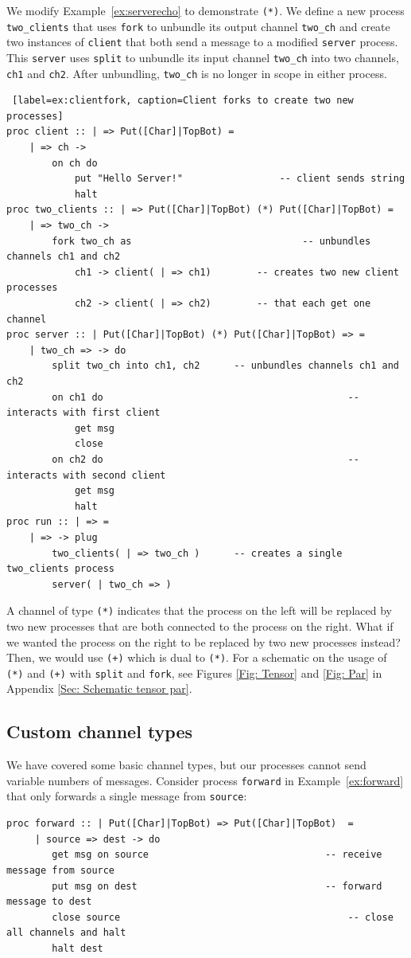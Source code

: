 \documentclass[11pt]{article}
\begin{document}
We modify Example~\ref{ex:serverecho} to demonstrate \lstinline$(*)$.
We define a new process \lstinline$two_clients$ that uses \lstinline$fork$ to unbundle its output channel \lstinline$two_ch$ and create two instances of \lstinline$client$ that both send a message to a modified \lstinline$server$ process. 
This \lstinline$server$ uses \lstinline$split$ to unbundle its input channel \lstinline$two_ch$ into two channels, \lstinline$ch1$ and \lstinline$ch2$. After unbundling, \lstinline$two_ch$ is no longer in scope in either process. %

\newpage
\begin{lstlisting} [label=ex:clientfork, caption=Client forks to create two new processes]
proc client :: | => Put([Char]|TopBot) =
	| => ch ->
		on ch do
			put "Hello Server!"					-- client sends string
			halt
proc two_clients :: | => Put([Char]|TopBot) (*) Put([Char]|TopBot) =
	| => two_ch ->
		fork two_ch as								-- unbundles channels ch1 and ch2
			ch1 -> client( | => ch1)		-- creates two new client processes
			ch2 -> client( | => ch2)		-- that each get one channel
proc server :: | Put([Char]|TopBot) (*) Put([Char]|TopBot) => =
	| two_ch => -> do
		split two_ch into ch1, ch2		-- unbundles channels ch1 and ch2
		on ch1 do											-- interacts with first client
			get msg
			close
		on ch2 do											-- interacts with second client
			get msg
			halt
proc run :: | => =
	| => -> plug
		two_clients( | => two_ch )		-- creates a single two_clients process
		server( | two_ch => )
\end{lstlisting}
A channel of type \lstinline$(*)$ indicates that the process on the left will be replaced by two new processes that are both connected to the process on the right.
What if we wanted the process on the right to be replaced by two new processes instead?
Then, we would use  \lstinline$(+)$ which is dual to \lstinline$(*)$.  For a schematic on the usage of \lstinline$(*)$ and \lstinline$(+)$ with \lstinline$split$ and \lstinline$fork$, see Figures \ref{Fig: Tensor} and \ref{Fig: Par} in Appendix \ref{Sec: Schematic tensor par}.

\subsection{Custom channel types}
\label{Sec:protocols}

We have covered some basic channel types, but our processes cannot send variable numbers of messages.
Consider process \lstinline$forward$ in Example~\ref{ex:forward} that only forwards a single message from \lstinline$source$:
\begin{lstlisting}[label=ex:forward, caption=Process that forwards a message]
proc forward :: | Put([Char]|TopBot) => Put([Char]|TopBot)  =
	 | source => dest -> do
		get msg on source								-- receive message from source
		put msg on dest									-- forward message to dest
		close source										-- close all channels and halt
		halt dest
\end{lstlisting}
\end{document}
